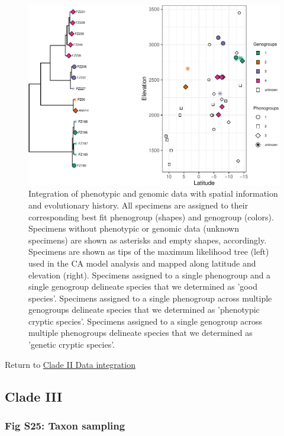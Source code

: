 \documentclass[
  11pt,
]{article}
\begin{document}
\begin{figure}
\includegraphics{Supplementary_Material_files/figure-latex/cladeIIfinalDelimitation2-1} \caption{Integration of phenotypic and genomic data with spatial information and evolutionary history. All specimens are assigned to their corresponding best fit phenogroup (shapes) and genogroup (colors). Specimens without phenotypic or genomic data (unknown specimens) are shown as asterisks and empty shapes, accordingly. Specimens are shown as tips of the maximum likelihood tree (left) used in the CA model analysis and mapped along latitude and elevation (right). Specimens assigned to a single phenogroup and a single genogroup delineate species that we determined as 'good species'. Specimens assigned to a single phenogroup across multiple genogroups delineate species that we determined as 'phenotypic cryptic species'. Specimens assigned to a single genogroup across multiple phenogroups delineate species that we determined as 'genetic cryptic species'.}\label{fig:cladeIIfinalDelimitation2}
\end{figure}

Return to \protect\hyperlink{data-integration-2}{Clade II Data integration}
\pagebreak

\hypertarget{clade-iii-2}{%
\subsection{Clade III}\label{clade-iii-2}}

\hypertarget{fig-s25-taxon-sampling}{%
\subsubsection{Fig S25: Taxon sampling}\label{fig-s25-taxon-sampling}}
\end{document}
